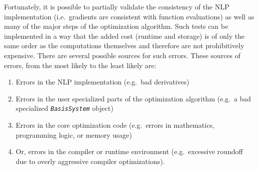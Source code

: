 \documentclass[pdf,12pt,report]{SANDreport}
\begin{document}
Fortunately, it is possible to partially validate the consistency of the NLP
implementation (i.e.~gradients are consistent with function evaluations) as
well as many of the major steps of the optimization algorithm.  Such tests can
be implemented in a way that the added cost (runtime and storage) is of only
the same order as the computations themselves and therefore are not
prohibitively expensive.  There are several possible sources for such errors.
These sources of errors, from the most likely to the least likely are:

\begin{enumerate}
\item Errors in the NLP implementation (e.g.\ bad derivatives)
\item Errors in the user specialized parts of the optimization algorithm
(e.g.\ a bad specialized {}\texttt{\textit{BasisSystem}} object)
\item Errors in the core optimization code (e.g.\ errors in mathematics,
programming logic, or memory usage)
\item Or, errors in the compiler or runtime environment (e.g.\ excessive
roundoff due to overly aggressive compiler optimizations).
\end{enumerate}
\end{document}
